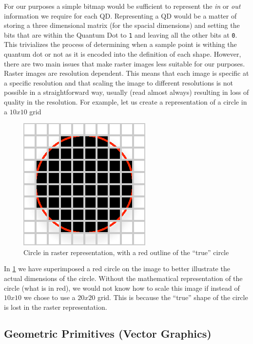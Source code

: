 \documentclass[authoryearcitations]{UoYCSproject}
\begin{document}
For our purposes a simple bitmap would be sufficient to represent the
\emph{in} or \emph{out} information we require for each QD. Representing a QD would be a matter of 
storing a three dimensional matrix (for the spacial dimensions) and setting the bits that are within
the Quantum Dot to \verb+1+ and leaving all the other bits at \verb+0+. This trivializes the process of 
determining when a sample point is withing the quantum dot or not as it is encoded into the definition of 
each shape. However, there are two main
issues that make raster images less suitable for our purposes. Raster images are resolution dependent. This means that
each image is specific at a specific resolution and that scaling the image to different resolutions is not possible in a 
straightforward way, usually (read almost always) resulting in loss of quality in the resolution. For example, let us
create a representation of a circle in a $10x10$ grid

\begin{figure}[h]
  \centering
  \includegraphics[scale=1.0]{figures/rasterCircle.eps}
    \caption{Circle in raster representation, with a red outline of the ``true'' circle}
  \label{rasterCircle}
\end{figure}

In \ref{rasterCircle} we have superimposed a red circle on the image to better illustrate the actual dimensions of the circle. 
Without the mathematical representation of the circle (what is in red), we would not know how to scale this image if instead of
$10x10$ we chose to use a $20x20$ grid. This is because the ``true'' shape of the circle is lost in the raster representation.  

\subsection{Geometric Primitives (Vector Graphics)}
\end{document}
